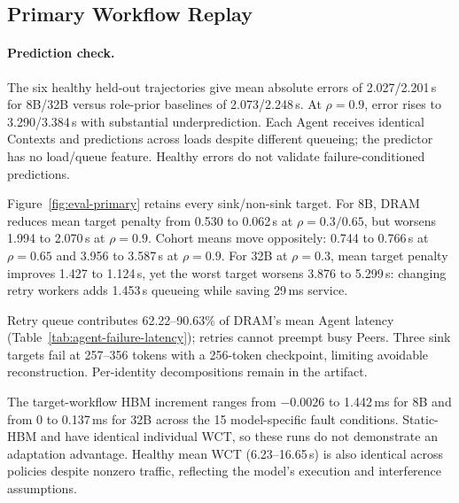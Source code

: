 \subsection{Primary Workflow Replay}
\label{sec:eval-primary}
\paragraph{Prediction check.}
The six healthy held-out trajectories give mean absolute errors of
2.027/2.201\,s for 8B/32B versus role-prior baselines of 2.073/2.248\,s.
At $\rho=0.9$, error rises to 3.290/3.384\,s with substantial underprediction.
Each Agent receives identical Contexts and predictions across loads despite
different queueing; the predictor has no load/queue feature. Healthy errors
do not validate failure-conditioned predictions.

Figure~\ref{fig:eval-primary} retains every sink/non-sink target.
For 8B, DRAM reduces mean target penalty from 0.530 to 0.062\,s at
$\rho=0.3/0.65$, but worsens 1.994 to 2.070\,s at $\rho=0.9$.
Cohort means move oppositely: 0.744 to 0.766\,s at $\rho=0.65$ and
3.956 to 3.587\,s at $\rho=0.9$.
For 32B at $\rho=0.3$, mean target penalty improves 1.427 to 1.124\,s,
yet the worst target worsens 3.876 to 5.299\,s: changing retry workers
adds 1.453\,s queueing while saving 29\,ms service.

Retry queue contributes 62.22--90.63\% of DRAM's mean Agent latency
(Table~\ref{tab:agent-failure-latency}); retries cannot preempt busy Peers.
Three sink targets fail at 257--356 tokens with a 256-token checkpoint,
limiting avoidable reconstruction. Per-identity decompositions remain in the artifact.

The target-workflow HBM increment ranges from $-0.0026$ to 1.442\,ms for 8B
and from 0 to 0.137\,ms for 32B across the 15 model-specific fault conditions.
Static-HBM and \system have identical individual WCT, so these runs do not
demonstrate an adaptation advantage. Healthy mean WCT (6.23--16.65\,s)
is also identical across policies despite nonzero traffic, reflecting the
model's execution and interference assumptions.

